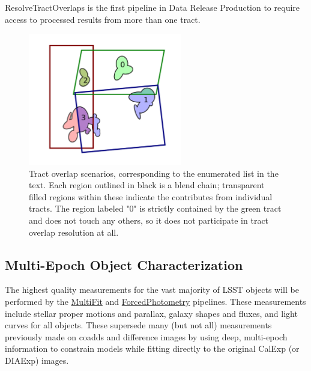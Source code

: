 ResolveTractOverlaps is the first pipeline in Data Release Production to require access to processed results from more than one tract.

\begin{figure}
\centering
\includegraphics[width=0.6\textwidth]{figures/blend_chains.pdf}
\caption{Tract overlap scenarios, corresponding to the enumerated list in the text.  Each region outlined in black is a blend chain; transparent filled regions within these indicate the contributes from individual tracts.  The region labeled "0" is strictly contained by the green tract and does not touch any others, so it does not participate in tract overlap resolution at all.
\label{fig:blend_chains}}
\end{figure}

\subsection{Multi-Epoch Object Characterization}
\label{sec:drp_multi_epoch_object_characterization}

The highest quality measurements for the vast majority of LSST objects will be performed by the \hyperref[sec:drpMultiFit]{MultiFit} and \hyperref[sec:drpForcedPhotometry]{ForcedPhotometry} pipelines.   These measurements include stellar proper motions and parallax, galaxy shapes and fluxes, and light curves for all objects.  These supersede many (but not all) measurements previously made on coadds and difference images by using deep, multi-epoch information to constrain models while fitting directly to the original CalExp (or DIAExp) images.

